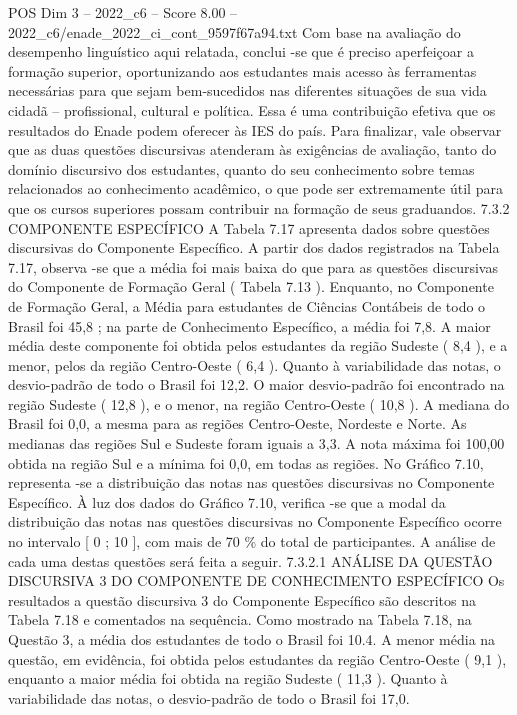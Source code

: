 \begin{textsample}{POS Dim 3 – 2022\_c6 – Score 8.00 – 2022\_c6/enade\_2022\_ci\_cont\_9597f67a94.txt}
Com base na avaliação do desempenho linguístico aqui relatada, conclui -se que é preciso aperfeiçoar a formação superior, oportunizando aos estudantes mais acesso às ferramentas necessárias para que sejam bem-sucedidos nas diferentes situações de sua vida cidadã – profissional, cultural e política.
Essa é uma contribuição efetiva que os resultados do Enade podem oferecer às IES do país.
Para finalizar, vale observar que as duas questões discursivas atenderam às exigências de avaliação, tanto do domínio discursivo dos estudantes, quanto do seu conhecimento sobre temas relacionados ao conhecimento acadêmico, o que pode ser extremamente útil para que os cursos superiores possam contribuir na formação de seus graduandos. 7.3.2 COMPONENTE ESPECÍFICO A Tabela 7.17 apresenta dados sobre questões discursivas do Componente Específico.
A partir dos dados registrados na Tabela 7.17, observa -se que a média foi mais baixa do que para as questões discursivas do Componente de Formação Geral ( Tabela 7.13 ).
Enquanto, no Componente de Formação Geral, a Média para estudantes de Ciências Contábeis de todo o Brasil foi 45,8 ; na parte de Conhecimento Específico, a média foi 7,8.
A maior média deste componente foi obtida pelos estudantes da região Sudeste ( 8,4 ), e a menor, pelos da região Centro-Oeste ( 6,4 ).
Quanto à variabilidade das notas, o desvio-padrão de todo o Brasil foi 12,2.
O maior desvio-padrão foi encontrado na região Sudeste ( 12,8 ), e o menor, na região Centro-Oeste ( 10,8 ).
A mediana do Brasil foi 0,0, a mesma para as regiões Centro-Oeste, Nordeste e Norte.
As medianas das regiões Sul e Sudeste foram iguais a 3,3.
A nota máxima foi 100,00 obtida na região Sul e a mínima foi 0,0, em todas as regiões.
No Gráfico 7.10, representa -se a distribuição das notas nas questões discursivas no Componente Específico.
À luz dos dados do Gráfico 7.10, verifica -se que a modal da distribuição das notas nas questões discursivas no Componente Específico ocorre no intervalo [ 0 ; 10 ], com mais de 70 \% do total de participantes.
A análise de cada uma destas questões será feita a seguir. 7.3.2.1 ANÁLISE DA QUESTÃO DISCURSIVA 3 DO COMPONENTE DE CONHECIMENTO ESPECÍFICO Os resultados a questão discursiva 3 do Componente Específico são descritos na Tabela 7.18 e comentados na sequência.
Como mostrado na Tabela 7.18, na Questão 3, a média dos estudantes de todo o Brasil foi 10.4.
A menor média na questão, em evidência, foi obtida pelos estudantes da região Centro-Oeste ( 9,1 ), enquanto a maior média foi obtida na região Sudeste ( 11,3 ).
Quanto à variabilidade das notas, o desvio-padrão de todo o Brasil foi 17,0.

\end{textsample}
